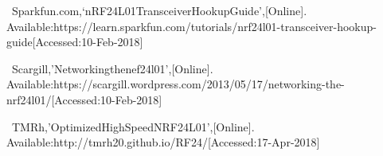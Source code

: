 \documentclass[journal]{IEEEtran}
\begin{document}
%
%
%
\begin{thebibliography}{1}

~Sparkfun.com,`nRF24L01TransceiverHookupGuide',[Online]. \\Available:https://learn.sparkfun.com/tutorials/nrf24l01-transceiver-hookup-guide[Accessed:10-Feb-2018]

~Scargill,'Networkingthenef24l01',[Online]. \\ Available:https://scargill.wordpress.com/2013/05/17/networking-the-nrf24l01/[Accessed:10-Feb-2018]

~TMRh,'OptimizedHighSpeedNRF24L01',[Online]. \\ Available:http://tmrh20.github.io/RF24/[Accessed:17-Apr-2018]


\end{thebibliography}
\end{document}
